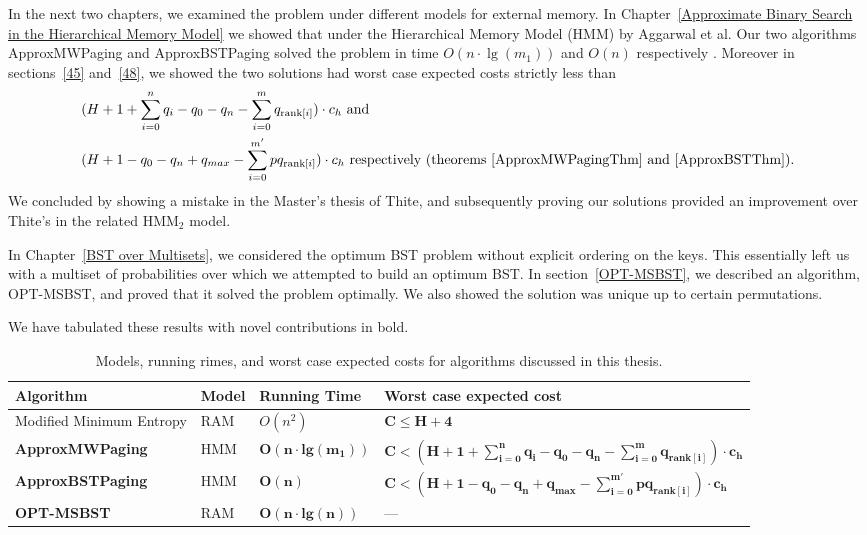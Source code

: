 \documentclass[letterpaper,12pt,titlepage,oneside,final]{book}
\theoremstyle{plain}
\begin{document}
 In the next two chapters, we examined the problem under different models for external memory. In Chapter~\ref{Approximate Binary Search in the Hierarchical Memory Model} we showed that under the Hierarchical Memory Model (HMM) by Aggarwal et al. Our two algorithms ApproxMWPaging and ApproxBSTPaging solved the problem in time $O(n\cdot \lg(m_1))$ and $O(n)$ respectively \cite{aggarwal1987model}. Moreover in sections~\ref{45} and~\ref{48}, we showed the two solutions had worst case expected costs strictly less than
\begin{align*}
&(H + 1 + \sum_{i=0}^n q_i - q_0 - q_n - \sum_{i=0}^m q_{\text{rank}[i]}) \cdot  c_h \text{ and} \\
&(H + 1 - q_0 - q_n + q_{max} - \sum_{i=0}^{m'} pq_{\text{rank}[i]})\cdot c_h \text{ respectively  (theorems~\ref{ApproxMWPagingThm} and~\ref{ApproxBSTThm})}.
\end{align*}
   We concluded by showing a mistake in the Master's thesis of Thite, and subsequently proving our solutions provided an improvement over Thite's in the related HMM$_2$ model.

In Chapter~\ref{BST over Multisets}, we considered the optimum BST problem without explicit ordering on the keys. This essentially left us with a multiset of probabilities over which we attempted to build an optimum BST. In section~\ref{OPT-MSBST}, we described an algorithm, OPT-MSBST, and proved that it solved the problem optimally. We also showed the solution was unique up to certain permutations.

We have tabulated these results with novel contributions in bold.

\begin{table}[!hb]


\begin{center}
    \begin{tabular}{ | l | l | l | p{7.1cm} |}
    \hline
    Algorithm & Model & Running Time & Worst case expected cost \\ \hline
    \scriptsize Modified Minimum Entropy & \scriptsize RAM  & \scriptsize $O(n^2)$    & \scriptsize $\mathbf{C \leq H+4}$    \\ \hline
   \scriptsize \textbf{ApproxMWPaging}  & \scriptsize HMM  & \scriptsize $\mathbf{O(n\cdot lg(m_1))}$   & \scriptsize $\mathbf{C < (H + 1 + \sum_{i=0}^n q_i - q_0 - q_n - \sum_{i=0}^m q_{\text{rank}[i]}) \cdot  c_h}$    \\ \hline
    \scriptsize \textbf{ApproxBSTPaging}  & \scriptsize HMM & \scriptsize $\mathbf{O(n)}$    &  \scriptsize $\mathbf{C < (H + 1 - q_0 - q_n + q_{max} - \sum_{i=0}^{m'} pq_{\text{rank}[i]})\cdot c_h}$    \\ \hline
    \scriptsize \textbf{OPT-MSBST}  & \scriptsize RAM  & \scriptsize $\mathbf{O(n\cdot lg(n))}$    & \scriptsize ---    \\ \hline
    \end{tabular}
\end{center}

\caption{Models, running rimes, and worst case expected costs for algorithms discussed in this thesis.}
\end{table}
 
\end{document}

